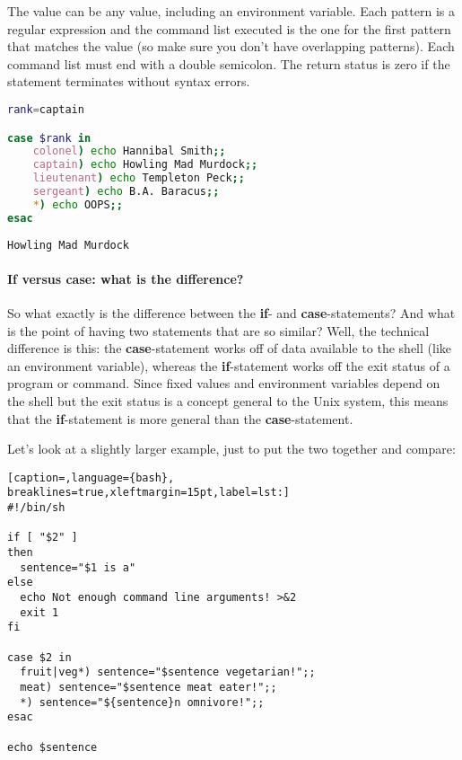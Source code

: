 The value can be any value, including an environment variable. Each pattern is
a regular expression and the command list executed is the one for the first
pattern that matches the value (so make sure you don't have overlapping
patterns). Each command list must end with a double semicolon. The return
status is zero if the statement terminates without syntax errors.


\lstset{basicstyle=\scriptsize, numbers=left, captionpos=b, tabsize=4}
\begin{lstlisting}[caption=The last 'if'-example revisited,language={bash},
breaklines=true,xleftmargin=15pt,label=lst:The last 'if'-example revisited]
rank=captain

case $rank in
    colonel) echo Hannibal Smith;;
    captain) echo Howling Mad Murdock;;
    lieutenant) echo Templeton Peck;;
    sergeant) echo B.A. Baracus;;
    *) echo OOPS;;
esac
\end{lstlisting}

\scriptsize
\begin{verbatim}
Howling Mad Murdock
\end{verbatim}
\normalsize

\paragraph{If versus case: what is the difference?}
So what exactly is the difference between the \textbf{if}- and
\textbf{case}-statements? And what is the point of having two statements that
are so similar? Well, the technical difference is this: the
\textbf{case}-statement works off of data available to the shell (like an
environment variable), whereas the \textbf{if}-statement works off the exit
status of a program or command. Since fixed values and environment variables
depend on the shell but the exit status is a concept general to the Unix
system, this means that the \textbf{if}-statement is more general than the
\textbf{case}-statement.

Let's look at a slightly larger example, just to put the two together and compare:

\lstset{basicstyle=\scriptsize, numbers=left, captionpos=b, tabsize=4}
\begin{lstlisting}[caption=,language={bash},
breaklines=true,xleftmargin=15pt,label=lst:]
#!/bin/sh

if [ "$2" ]
then
  sentence="$1 is a"
else
  echo Not enough command line arguments! >&2
  exit 1
fi

case $2 in
  fruit|veg*) sentence="$sentence vegetarian!";;
  meat) sentence="$sentence meat eater!";;
  *) sentence="${sentence}n omnivore!";;
esac

echo $sentence
\end{lstlisting}

